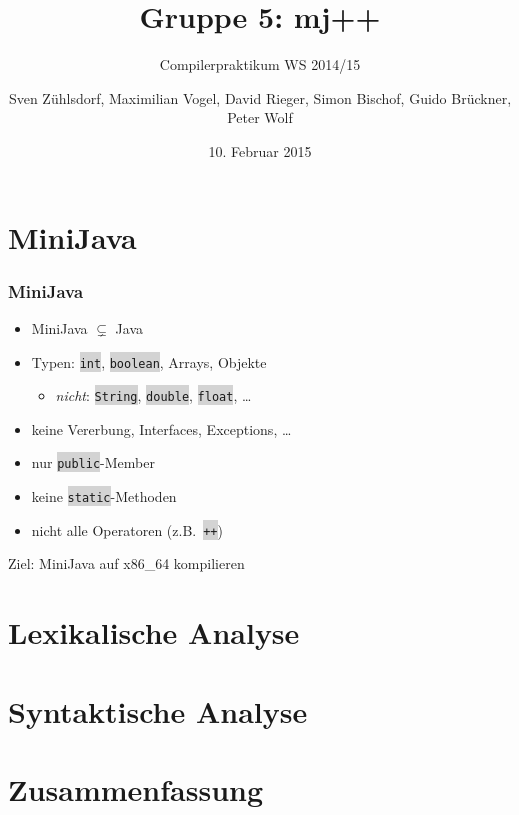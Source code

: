 \documentclass[18pt]{beamer}
\title[]{Gruppe 5: mj++}
\subtitle{Compilerpraktikum WS 2014/15}
\author{Sven Zühlsdorf, Maximilian Vogel, David Rieger, Simon Bischof, Guido Brückner, Peter Wolf}
\date{10. Februar 2015}
\institute{Institut für Programmstrukturen und Datenorganistation}
\newcommand{\code}[1]{\colorbox{lightgray}{\texttt{\upshape #1}}}
\begin{document}

\begin{frame}
\titlepage
\end{frame}


\section{MiniJava}

\begin{frame}
    \frametitle{MiniJava}
    \begin{itemize}
        \item MiniJava $\subsetneq$ Java
        \item Typen: \code{int}, \code{boolean}, Arrays, Objekte
            \begin{itemize}
                \item \emph{nicht}: \code{String}, \code{double}, \code{float}, \ldots
            \end{itemize}
        \item keine Vererbung, Interfaces, Exceptions, \ldots
        \item nur \code{public}-Member
        \item keine \code{static}-Methoden
        \item nicht alle Operatoren (z.B.\ \code{++})
    \end{itemize}
    \vskip 1cm
    \begin{center}
        Ziel: MiniJava auf x86\_64 kompilieren
    \end{center}
\end{frame}

\section{Lexikalische Analyse}


\section{Syntaktische Analyse}


\section{Zusammenfassung}

\end{document}

